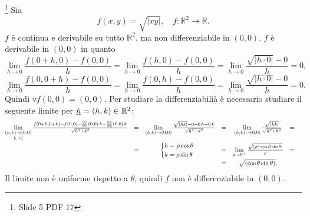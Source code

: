 \begin{example}
	\footnote{Slide 5 PDF 17}
	Sia
	\begin{equation*}
		f(x,y) = \sqrt{|xy|},\quad f\colon\mathbb{R}^2\rightarrow\mathbb{R}.
	\end{equation*}
	$f$ è continua e derivabile su tutto $\mathbb{R}^2$, ma non differenziabile in $(0,0)$.
	$f$ è derivabile in $(0,0)$ in quanto
	\begin{equation*}
		\lim\limits_{h\rightarrow 0}\frac{f(0+h,0)-f(0,0)}{h} = \lim\limits_{h\rightarrow 0}\frac{f(h,0)-f(0,0)}{h} = \lim\limits_{h\rightarrow 0}\frac{\sqrt{|h\cdot 0|}- 0}{h} = 0,
	\end{equation*}	
	\begin{equation*}
		\lim\limits_{h\rightarrow 0}\frac{f(0,0 + h)-f(0,0)}{h} = \lim\limits_{h\rightarrow 0}\frac{f(0, h)-f(0,0)}{h} = \lim\limits_{h\rightarrow 0}\frac{\sqrt{|h\cdot 0|}- 0}{h} = 0.
	\end{equation*}
	Quindi $\triangledown f(0,0)= (0,0)$. Per studiare la differenziabilià è necessario studiare il seguente limite per $\uline{h} = (h,k)\in\mathbb{R}^2$:
	\begin{equation*}
		\begin{matrix}
			\lim\limits_{\underset{\uline h\rightarrow \uline 0}{(h,k)\rightarrow (0,0)}}\frac{f(0+ h, 0 + k) - f(0,0) - \frac{\partial f}{\partial x}(0,0)\, h - \frac{\partial f}{\partial y}(0,0)\, k}{\sqrt{h^2 + k^2}} &=& \lim\limits_{(h,k)\rightarrow (0,0)} \frac{\sqrt{|hk|} - 0 - 0\, h - 0\,k}{\sqrt{h^2 + k^2}}&=&\lim\limits_{(h, k)\rightarrow(0,0)}\frac{\sqrt{|hk|}}{\sqrt{h^2 + k^2}}&=&\\
			&=&
			\begin{cases}
				h =\rho\cos\theta\\
				k = \rho\sin\theta
			\end{cases}
			&=& \lim\limits_{\rho\rightarrow 0^+} \frac{\sqrt{|\rho^2 \cos\theta\sin\theta|}}{\rho} &=&\\
			&&&=& \sqrt{(\cos\theta \sin\theta)}.
		\end{matrix}
	\end{equation*}
	Il limite non è uniforme rispetto a $\theta$, quindi $f$ non è differenziabile in $(0,0)$. 
\end{example}

